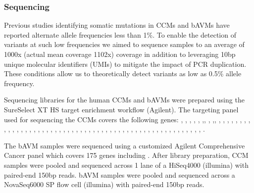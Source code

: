 \subsubsection{Sequencing}
Previous studies identifying somatic mutations in CCMs and bAVMs have reported alternate allele frequencies less than 1\%. To enable the detection of variants at such low frequencies we aimed to sequence samples to an average of 1000x (actual mean coverage 1102x) coverage in addition to leveraging 10bp unique molecular identifiers (UMIs) to mitigate the impact of PCR duplication. These conditions allow us to theoretically detect variants as low as 0.5\% allele frequency. 

Sequencing libraries for the human CCMs and bAVMs were prepared using the SureSelect XT HS target enrichment workflow (Agilent). The targeting panel used for sequencing the CCMs covers the following genes: , , , , ,  ,, , ,, , , , , , , , , , , , , , , , , , , , , , , , , , , , , , , , , , , , , , , , , , , , , , , , , , , , , , , , . 

The bAVM samples were sequenced using a customized Agilent Comprehensive Cancer panel which covers 175 genes including . After library preparation, CCM samples were pooled and sequenced across 1 lane of a HiSeq4000 (illumina) with paired-end 150bp reads. bAVM samples were pooled and sequenced across a NovaSeq6000 SP flow cell (illumina) with paired-end 150bp reads. 

